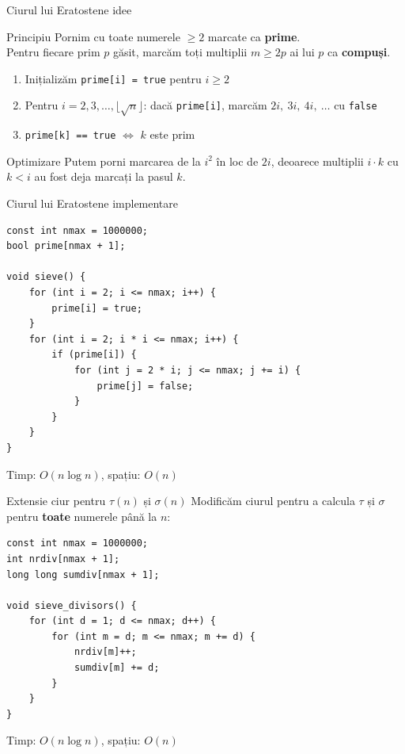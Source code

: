 \documentclass[10pt]{beamer}
\begin{document}
\begin{frame}{Ciurul lui Eratostene \textemdash{} idee}
  \begin{block}{Principiu}
    Pornim cu toate numerele $\geq 2$ marcate ca \textbf{prime}.\\
    Pentru fiecare prim $p$ găsit, marcăm toți multiplii $m \geq 2p$ ai lui $p$ ca \textbf{compuși}.
  \end{block}
  \begin{enumerate}
    \item Inițializăm \texttt{prime[i] = true} pentru $i \geq 2$
    \item Pentru $i = 2, 3, \ldots, \lfloor\sqrt{n}\rfloor$: dacă \texttt{prime[i]}, marcăm $2i,\ 3i,\ 4i,\ \ldots$ cu \texttt{false}
    \item \texttt{prime[k] == true} $\Leftrightarrow$ $k$ este prim
  \end{enumerate}
  \begin{alertblock}{Optimizare}
    Putem porni marcarea de la $i^2$ în loc de $2i$, deoarece multiplii $i \cdot k$ cu $k < i$ au fost deja marcați la pasul $k$.
  \end{alertblock}
\end{frame}

\begin{frame}[fragile]{Ciurul lui Eratostene \textemdash{} implementare}
  \begin{lstlisting}
const int nmax = 1000000;
bool prime[nmax + 1];

void sieve() {
    for (int i = 2; i <= nmax; i++) {
        prime[i] = true;
    }
    for (int i = 2; i * i <= nmax; i++) {
        if (prime[i]) {
            for (int j = 2 * i; j <= nmax; j += i) {
                prime[j] = false;
            }
        }
    }
}
  \end{lstlisting}
  Timp: $O(n \log n)$, spațiu: $O(n)$
\end{frame}

\begin{frame}[fragile]{Extensie \textemdash{} ciur pentru $\tau(n)$ și $\sigma(n)$}
  Modificăm ciurul pentru a calcula $\tau$ și $\sigma$ pentru \textbf{toate} numerele până la $n$:
  \begin{lstlisting}
const int nmax = 1000000;
int nrdiv[nmax + 1];
long long sumdiv[nmax + 1];

void sieve_divisors() {
    for (int d = 1; d <= nmax; d++) {
        for (int m = d; m <= nmax; m += d) {
            nrdiv[m]++;
            sumdiv[m] += d;
        }
    }
}
  \end{lstlisting}
  Timp: $O(n \log n)$, spațiu: $O(n)$
\end{frame}
\end{document}
